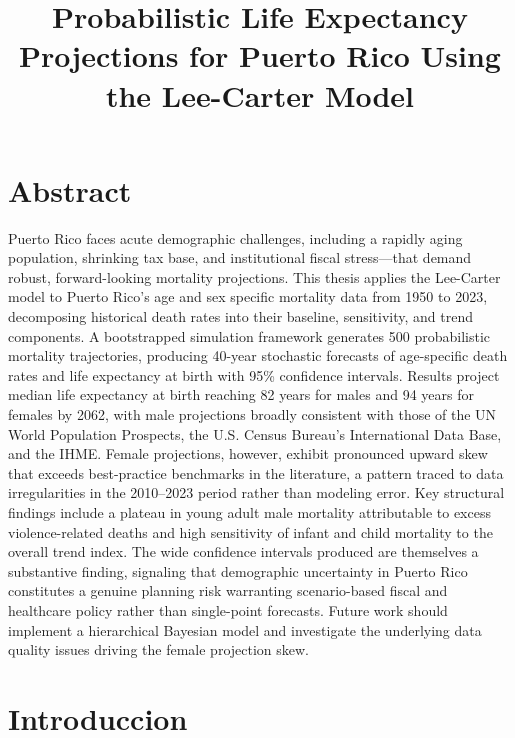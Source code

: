 \documentclass[
  12pt,
]{report}
\title{Probabilistic Life Expectancy Projections for Puerto Rico Using
the Lee-Carter Model}
\author{}
\date{}
\renewcommand*\contentsname{Table of contents}
\newcommand\contentsname{Table of contents}
\begin{document}
\maketitle

\renewcommand*\contentsname{Table of Contents}
{
\hypersetup{linkcolor=}
\setcounter{tocdepth}{1}
\tableofcontents
}

\chapter{Abstract}\label{abstract}

Puerto Rico faces acute demographic challenges, including a rapidly
aging population, shrinking tax base, and institutional fiscal
stress---that demand robust, forward-looking mortality projections. This
thesis applies the Lee-Carter model to Puerto Rico's age and sex
specific mortality data from 1950 to 2023, decomposing historical death
rates into their baseline, sensitivity, and trend components. A
bootstrapped simulation framework generates 500 probabilistic mortality
trajectories, producing 40-year stochastic forecasts of age-specific
death rates and life expectancy at birth with 95\% confidence intervals.
Results project median life expectancy at birth reaching 82 years for
males and 94 years for females by 2062, with male projections broadly
consistent with those of the UN World Population Prospects, the U.S.
Census Bureau's International Data Base, and the IHME. Female
projections, however, exhibit pronounced upward skew that exceeds
best-practice benchmarks in the literature, a pattern traced to data
irregularities in the 2010--2023 period rather than modeling error. Key
structural findings include a plateau in young adult male mortality
attributable to excess violence-related deaths and high sensitivity of
infant and child mortality to the overall trend index. The wide
confidence intervals produced are themselves a substantive finding,
signaling that demographic uncertainty in Puerto Rico constitutes a
genuine planning risk warranting scenario-based fiscal and healthcare
policy rather than single-point forecasts. Future work should implement
a hierarchical Bayesian model and investigate the underlying data
quality issues driving the female projection skew.

\chapter{Introduccion}\label{introduccion}
\end{document}
